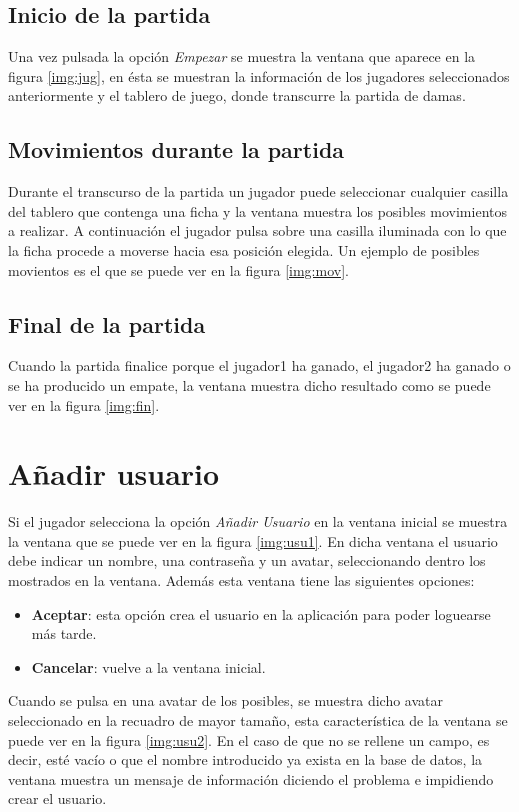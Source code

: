 \subsection{Inicio de la partida}
Una vez pulsada la opción \emph{Empezar} se muestra la ventana que aparece en 
la figura \ref{img:jug}, en ésta se muestran la información de los jugadores 
seleccionados anteriormente y el tablero de juego, donde transcurre la partida
de damas.

\subsection{Movimientos durante la partida}
Durante el transcurso de la partida un jugador puede seleccionar cualquier 
casilla del tablero que contenga una ficha y la ventana muestra los posibles
movimientos a realizar. A continuación el jugador pulsa sobre una casilla 
iluminada con lo que la ficha procede a moverse hacia esa posición elegida. Un 
ejemplo de posibles movientos es el que se puede ver en la figura \ref{img:mov}.

\subsection{Final de la partida}
Cuando la partida finalice porque el jugador1 ha ganado, el jugador2 ha ganado o
se ha producido un empate, la ventana muestra dicho resultado como se puede ver
en la figura \ref{img:fin}.

\section{Añadir usuario}
Si el jugador selecciona la opción \emph{Añadir Usuario} en la ventana inicial
se muestra la ventana que se puede ver en la figura \ref{img:usu1}. En dicha
ventana el usuario debe indicar un nombre, una contraseña y un avatar, 
seleccionando dentro los mostrados en la ventana. Además esta ventana tiene
las siguientes opciones:
\begin{itemize}
\item \textbf{Aceptar}: esta opción crea el usuario en la aplicación para poder 
loguearse más tarde.
\item \textbf{Cancelar}: vuelve a la ventana inicial.
\end{itemize}
Cuando se pulsa en una avatar de los posibles, se muestra dicho avatar 
seleccionado en la recuadro de mayor tamaño, esta característica de la ventana
se puede ver en la figura \ref{img:usu2}.
En el caso de que no se rellene un campo, es decir, esté vacío o que el nombre
introducido ya exista en la base de datos, la ventana muestra un mensaje de 
información diciendo el problema e impidiendo crear el usuario.

